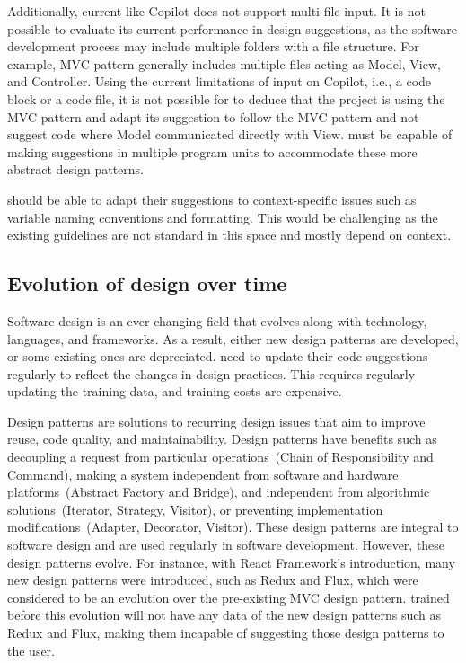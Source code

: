 Additionally, current \cct{} like Copilot does not support multi-file input. It is not possible to evaluate its current performance in design suggestions, as the software development process may include multiple folders with a file structure. 
For example, MVC pattern generally includes multiple files acting as Model, View, and Controller. Using the current limitations of input on Copilot, i.e., a code block or a code file, it is not possible for \cct{} to deduce that the project is using the MVC pattern and adapt its suggestion to follow the MVC pattern and not suggest code where Model communicated directly with View. \cct{} must be capable of making suggestions in multiple program units to accommodate these more abstract design patterns.

\cct{} should be able to adapt their suggestions to context-specific issues such as variable naming conventions and formatting. 
This would be challenging as the existing guidelines are not standard in this space and mostly depend on context.

\subsection{Evolution of design over time}
\label{evolution}
Software design is an ever-changing field that evolves along with technology, languages, and frameworks. As a result, either new design patterns are developed, or some existing ones are depreciated.
\cct{} need to update their code suggestions regularly to reflect the changes in design practices. 
This requires regularly updating the training data, and training costs are expensive.

Design patterns are solutions to recurring design issues that aim to improve reuse, code quality, and maintainability.
Design patterns have benefits such as decoupling a request from particular operations~(Chain of Responsibility and Command), making a system independent from software and hardware platforms~(Abstract Factory and Bridge), and independent from algorithmic solutions~(Iterator, Strategy, Visitor), or preventing implementation modifications~(Adapter, Decorator, Visitor). These design patterns are integral to software design and are used regularly in software development.
However, these design patterns evolve. For instance, with React Framework's introduction, many new design patterns were introduced, such as Redux and Flux, which were considered to be an evolution over the pre-existing MVC design pattern.
\cct{} trained before this evolution will not have any data of the new design patterns such as Redux and Flux, making them incapable of suggesting those design patterns to the user. 

